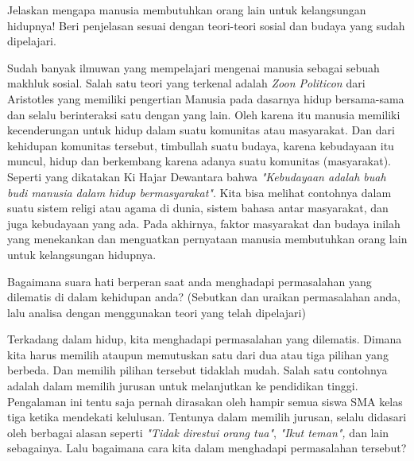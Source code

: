 \documentclass[
  11pt,
  answers  
]{exam}
\begin{document}
\begin{questions}
      \pagebreak

      \question
      Jelaskan mengapa manusia membutuhkan orang lain untuk kelangsungan hidupnya! Beri penjelasan sesuai dengan teori-teori
      sosial dan budaya yang sudah dipelajari.
      \begin{solution}
        Sudah banyak ilmuwan yang mempelajari mengenai manusia sebagai sebuah makhluk sosial. Salah satu teori yang terkenal
        adalah \emph{Zoon Politicon} dari Aristotles yang memiliki pengertian Manusia pada dasarnya hidup bersama-sama dan
        selalu berinteraksi satu dengan yang lain. Oleh karena itu manusia memiliki kecenderungan untuk hidup dalam suatu
        komunitas atau masyarakat. Dan dari kehidupan komunitas tersebut, timbullah suatu budaya, karena kebudayaan itu muncul,
        hidup dan berkembang karena adanya suatu komunitas (masyarakat). Seperti yang dikatakan Ki Hajar Dewantara bahwa 
        \emph{"Kebudayaan adalah buah budi manusia dalam hidup bermasyarakat"}. Kita bisa melihat contohnya dalam suatu sistem religi
        atau agama di dunia, sistem bahasa antar masyarakat, dan juga kebudayaan yang ada. Pada akhirnya, faktor masyarakat dan budaya inilah
        yang menekankan dan menguatkan pernyataan manusia membutuhkan orang lain untuk kelangsungan hidupnya.
      \end{solution}

      \pagebreak

      \question
      Bagaimana suara hati berperan saat anda menghadapi permasalahan yang dilematis di dalam kehidupan anda? (Sebutkan dan 
      uraikan permasalahan anda, lalu analisa dengan menggunakan teori yang telah dipelajari)
      \begin{solution}
        Terkadang dalam hidup, kita menghadapi permasalahan yang dilematis. Dimana kita harus memilih ataupun memutuskan satu dari
        dua atau tiga pilihan yang berbeda. Dan memilih pilihan tersebut tidaklah mudah. Salah satu contohnya adalah dalam memilih jurusan
        untuk melanjutkan ke pendidikan tinggi. Pengalaman ini tentu saja pernah dirasakan oleh hampir semua siswa SMA kelas tiga ketika mendekati
        kelulusan. Tentunya dalam memilih jurusan, selalu didasari oleh berbagai alasan seperti \emph{"Tidak direstui orang tua"}, \emph{"Ikut teman",}
        dan lain sebagainya. Lalu bagaimana cara kita dalam menghadapi permasalahan tersebut?


\end{solution}
\end{questions}
\end{document}

